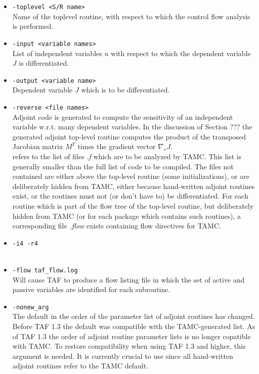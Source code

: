 \begin{itemize}
%
\item {\tt -toplevel <S/R name>} \\
Name of the toplevel routine, with respect to which the
control flow analysis is performed.
%
\item {\tt -input <variable names>} \\
List of independent variables $ u $ with respect to which the
dependent variable $ J $ is differentiated.
%
\item {\tt -output <variable name>} \\
Dependent variable $ J $  which is to be differentiated.
%
\item {\tt -reverse <file names>} \\
Adjoint code is generated to compute the sensitivity of an
independent variable w.r.t.  many dependent variables.
In the discussion of Section ???
the generated adjoint top-level routine computes the product
of the transposed Jacobian matrix $ M^T $ times
the gradient vector $ \nabla_v J $.
\\
{\tt <file names>} refers to the list of files {\it .f} which are to be
analyzed by TAMC. This list is generally smaller than the full list
of code to be compiled. The files not contained are either
above the top-level routine (some initializations), or are
deliberately hidden from TAMC, either because hand-written
adjoint routines exist, or the routines must not (or don't have to)
be differentiated. For each routine which is part of the flow tree
of the top-level routine, but deliberately hidden from TAMC
(or for each package which contains such routines),
a corresponding file {\it .flow} exists containing flow directives
for TAMC.
%
\item {\tt -i4 -r4} \\
~
%
\item {\tt -flow taf_flow.log} \\
Will cause TAF to produce a flow listing file in which 
the set of active and passive variables are identified
for each subroutine.
%
\item {\tt -nonew_arg} \\
The default in the order of the parameter list of
adjoint routines has changed.
Before TAF 1.3 the default was compatible with the
TAMC-generated list. As of TAF 1.3 the order of adjoint
routine parameter lists is no longer copatible with TAMC.
To restore compatibility when using TAF 1.3 and higher,
this argument is needed.
It is currently crucial to use since all hand-written
adjoint routines refer to the TAMC default.
%
\end{itemize}


